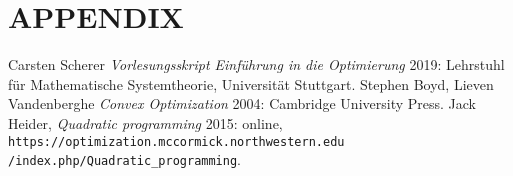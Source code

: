 \documentclass[a4paper, 10pt, conference]{ieeeconf}      %
\begin{document}





\newpage
\newpage
\section*{APPENDIX}





%
%
\newpage
\begin{thebibliography}{99}
	   Carsten Scherer {\em Vorlesungsskript Einführung in die Optimierung} 2019: Lehrstuhl für Mathematische Systemtheorie, Universität Stuttgart.
	   Stephen Boyd, Lieven Vandenberghe {\em Convex Optimization} 2004: Cambridge University Press.
	   Jack Heider, {\em Quadratic programming}  2015: online, \verb|https://optimization.mccormick.northwestern.edu|\\ \verb|/index.php/Quadratic_programming|.
\end{thebibliography}
\end{document}
